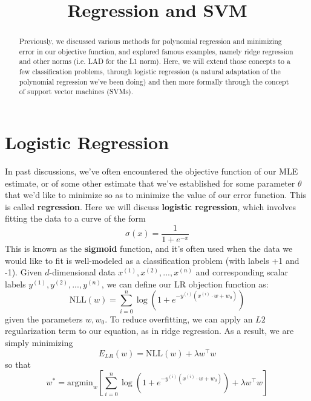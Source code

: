 \documentclass[10pt,letterpaper]{article}
\title{\vspace{-4ex}Regression and SVM\vspace{-3.5ex}}
\begin{document}
\maketitle
\vspace{-0.5em}
\begin{abstract}
Previously, we discussed various methods for polynomial regression and minimizing error in our objective function, and explored famous examples, namely ridge regression and other norms (i.e. LAD for the L1 norm). Here, we will extend those concepts to a few classification problems, through logistic regression (a natural adaptation of the polynomial regression we've been doing) and then more formally through the concept of support vector machines (SVMs).
\end{abstract}

\section{Logistic Regression}
In past discussions, we've often encountered the objective function of our MLE estimate, or of some other estimate that we've established for some parameter $\theta$ that we'd like to minimize so as to minimize the value of our error function. This is called \textbf{regression}. Here we will discuss \textbf{logistic regression}, which involves fitting the data to a curve of the form
$$\sigma(x) = \frac{1}{1+e^{-x}}$$
This is known as the \textbf{sigmoid} function, and it's often used when the data we would like to fit is well-modeled as a classification problem (with labels +1 and -1). Given $d$-dimensional data $x^{(1)}, x^{(2)}, ... , x^{(n)}$ and corresponding scalar labels $y^{(1)}, y^{(2)}, ... , y^{(n)}$, we can define our LR objection function as:
$$\text{NLL}(w) = \sum_{i=0}^n\log(1+e^{-y^{(i)}(x^{(i)}\cdot w+w_0)})$$
given the parameters $w, w_0$. To reduce overfitting, we can apply an $L2$ regularization term to our equation, as in ridge regression. As a result, we are simply minimizing
$$E_{LR}(w) = \text{NLL}(w)+\lambda w^\intercal w$$
so that
$$w^* = \text{argmin}_w \left[\sum_{i=0}^n\log(1+e^{-y^{(i)}(x^{(i)}\cdot w+w_0)}) + \lambda w^\intercal w\right]$$
\end{document}
